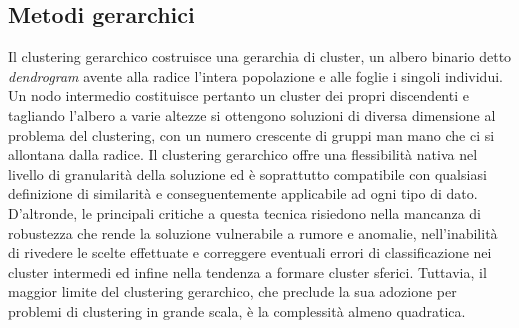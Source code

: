 \subsection{Metodi gerarchici}
Il clustering gerarchico costruisce una gerarchia di cluster, un albero binario detto \textit{dendrogram} avente alla radice l'intera popolazione e alle foglie i singoli individui. Un nodo intermedio costituisce pertanto un cluster dei propri discendenti e tagliando l'albero a varie altezze si ottengono soluzioni di diversa dimensione al problema del clustering, con un numero crescente di gruppi man mano che ci si allontana dalla radice.
Il clustering gerarchico offre una flessibilit\`a nativa nel livello di granularit\`a della soluzione ed \`e soprattutto compatibile con qualsiasi definizione di similarit\`a e conseguentemente applicabile ad ogni tipo di dato. D'altronde, le principali critiche a questa tecnica risiedono nella mancanza di robustezza che rende la soluzione vulnerabile a rumore e anomalie, nell'inabilit\`a di rivedere le scelte effettuate e correggere eventuali errori di classificazione nei cluster intermedi ed infine nella tendenza a formare cluster sferici. Tuttavia, il maggior limite del clustering gerarchico, che preclude la sua adozione per problemi di clustering in grande scala, \`e la complessit\`a almeno quadratica.
